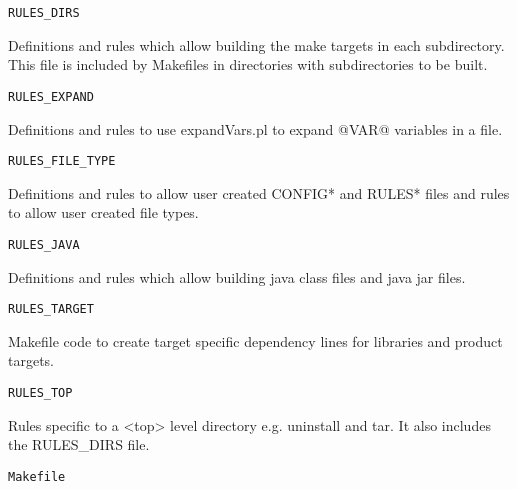 \begin{description}
\end{description}\begin{verbatim}RULES_DIRS
\end{verbatim}\begin{description}\item Definitions and rules which allow building the make targets in each subdirectory. This file is included by Makefiles 
in directories with subdirectories to be built.

\end{description}\begin{verbatim}RULES_EXPAND
\end{verbatim}\begin{description}\item Definitions and rules to use expandVars.pl to expand @VAR@ variables in a file.

\end{description}\begin{verbatim}RULES_FILE_TYPE
\end{verbatim}\begin{description}\item Definitions and rules to allow user created CONFIG* and RULES* files and rules to allow user created file types.

\end{description}\begin{verbatim}RULES_JAVA
\end{verbatim}
\begin{description}\item Definitions and rules which allow building java class files and java jar files.

\end{description}\begin{verbatim}RULES_TARGET
\end{verbatim}\begin{description}\item Makefile code to create target specific dependency lines for libraries and product targets.

\end{description}\begin{verbatim}RULES_TOP
\end{verbatim}\begin{description}\item Rules specific to a \textless{}top\textgreater{} level directory e.g. uninstall and tar. It also includes the RULES\_DIRS file.

\end{description}\begin{verbatim}Makefile
\end{verbatim}
